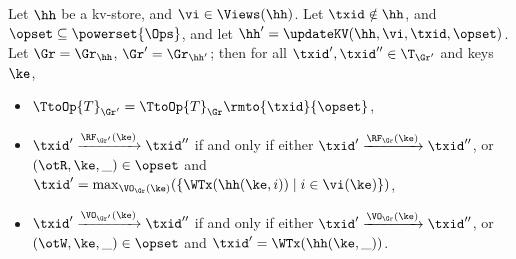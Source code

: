 \begin{lemma}
\label{lem:graph.update}
Let $\hh$ be a kv-store, and $\vi \in \Views(\hh)$. Let $\txid \notin \hh$, and 
$\opset \subseteq \powerset{\Ops}$, and let $\hh' = \updateKV(\hh, \vi, \txid, \opset)$. 
Let $\Gr = \Gr_{\hh}$, $\Gr' = \Gr_{\hh'}$; then for all $\txid', \txid'' \in \T_{\Gr'}$ and keys $\ke$, 
\begin{itemize}
\item $\TtoOp{T}_{\Gr'} = \TtoOp{T}_{\Gr}\rmto{\txid}{\opset}$, 
\item $\txid' \xrightarrow{\RF_{\Gr'}(\ke)} \txid''$ if and only if either 
$\txid' \xrightarrow{\RF_{\Gr}(\ke)} \txid''$, or $(\otR, \ke, \_) \in \opset$ and 
$\txid' = \max_{\VO_{\Gr}(\ke)}(\{\WTx(\hh(\ke, i)) \mid i \in \vi(\ke)\})$, 
\item $\txid' \xrightarrow{\VO_{\Gr'}(\ke)} \txid''$ if and only if either 
$\txid' \xrightarrow{\VO_{\Gr}(\ke)} \txid''$, or $(\otW, \ke, \_) \in \opset$ 
and $\txid' = \WTx(\hh(\ke, \_))$. 
\end{itemize}
\end{lemma}

